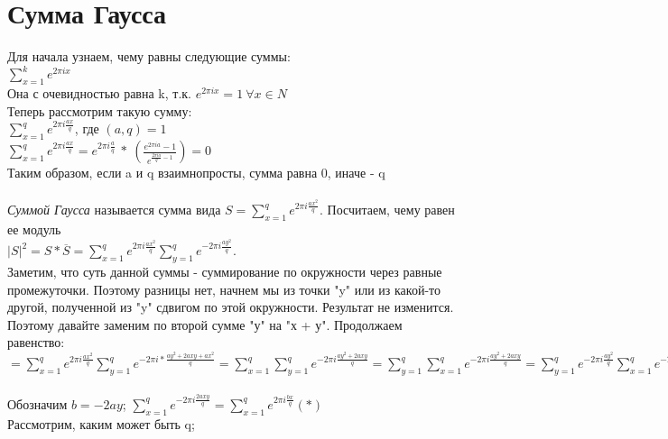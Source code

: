 \setcounter{section}{80}
\section{Сумма Гаусса}
Для начала узнаем, чему равны следующие суммы:
\\
$\sum\limits_{x=1}^k e^{2\pi i x}$\\ Она с очевидностью равна k, т.к. $e^{2\pi i x} = 1 \ \forall x \in N$
\\
Теперь рассмотрим такую сумму:\\
$\sum\limits_{x=1}^q e^{2\pi i \frac{ax}{q}}$, где $(a,q) = 1$\\
$\sum\limits_{x=1}^q e^{2\pi i \frac{ax}{q}} = e^{2\pi i \frac{a}{q}} \ * \ (\frac{e^{2\pi i a} - 1}{e^{\frac{2\pi i a}{q} - 1}}) = 0$ \\
Таким образом, если a и q взаимнопросты, сумма равна 0, иначе - q
\\
\\
\textit{Суммой Гаусса} называется сумма вида $S = \sum\limits_{x=1}^q e^{2\pi i \frac{ax^2}{q}}$. Посчитаем, чему равен ее модуль \\
$|S|^2 = S*\overline{S} = \sum\limits_{x=1}^q e^{2\pi i \frac{ax^2}{q}} \sum\limits_{y=1}^q e^{ -2\pi i \frac{ay^2}{q}}$.\\ Заметим, что суть данной суммы - суммирование по окружности через равные промежуточки. Поэтому разницы нет, начнем мы из точки "y"  или из какой-то другой, полученной из "y" сдвигом по этой окружности. Результат не изменится. Поэтому давайте заменим по второй сумме "у" на "х + у". Продолжаем равенство:\\ $= \sum\limits_{x=1}^q e^{2\pi i \frac{ax^2}{q}}\sum\limits_{y=1}^q e^{- 2\pi i *  \frac{ay^2 + 2axy + ax^2}{q}} =\sum\limits_{x=1}^q \sum\limits_{y=1}^q e^{-2\pi i \frac{ay^2 + 2axy}{q}} = \sum\limits_{y=1}^q \sum\limits_{x=1}^q e^{-2\pi i \frac{ay^2 + 2axy}{q}} = \sum\limits_{y=1}^q e^{-2\pi i \frac{ay^2}{q}} \sum\limits_{x=1}^q e^{-2\pi i \frac{2axy}{q}}$\\ \\
Обозначим  $b = -2ay$; $\sum\limits_{x=1}^q e^{-2\pi i \frac{2axy}{q}} = \sum\limits_{x=1}^q e^{2\pi i \frac{bx}{q}} (*)$
\\
Рассмотрим, каким может быть q;
